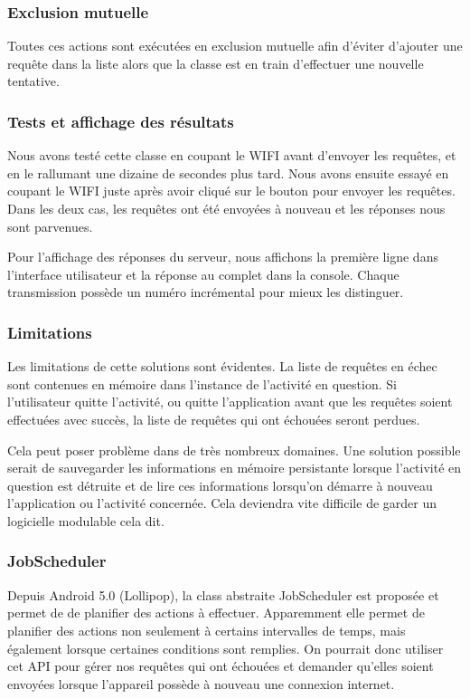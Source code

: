 \documentclass[francais,12pt]{article}
\begin{document}
	\subsubsection*{Exclusion mutuelle}
	Toutes ces actions sont exécutées en exclusion mutuelle afin d'éviter d'ajouter une requête dans la liste alors que la classe est en train d'effectuer une nouvelle tentative. 
	
	\subsubsection*{Tests et affichage des résultats}
	Nous avons testé cette classe en coupant le WIFI avant d'envoyer les requêtes, et en le rallumant une dizaine de secondes plus tard. Nous avons ensuite essayé en coupant le WIFI juste après avoir cliqué sur le bouton pour envoyer les requêtes. Dans les deux cas, les requêtes ont été envoyées à nouveau et les réponses nous sont parvenues. 
	
	Pour l'affichage des réponses du serveur, nous affichons la première ligne dans l'interface utilisateur et la réponse au complet dans la console. Chaque transmission possède un numéro incrémental pour mieux les distinguer.
	
	\subsubsection*{Limitations}
	Les limitations de cette solutions sont évidentes. La liste de requêtes en échec sont contenues en mémoire dans l'instance de l'activité en question. Si l'utilisateur quitte l'activité, ou quitte l'application avant que les requêtes soient effectuées avec succès, la liste de requêtes qui ont échouées seront perdues. 
	
	Cela peut poser problème dans de très nombreux domaines. Une solution possible serait de sauvegarder les informations en mémoire persistante lorsque l'activité en question est détruite et de lire ces informations lorsqu'on démarre à nouveau l'application ou l'activité concernée. Cela deviendra vite difficile de garder un logicielle modulable cela dit.
	
	\subsubsection*{JobScheduler}
	Depuis Android 5.0 (Lollipop), la class abstraite JobScheduler est proposée et permet de de planifier des actions à effectuer. Apparemment elle permet de planifier des actions non seulement à certains intervalles de temps, mais également lorsque certaines conditions sont remplies. On pourrait donc utiliser cet API pour gérer nos requêtes qui ont échouées et demander qu'elles soient envoyées lorsque l'appareil possède à nouveau une connexion internet. 
	
\end{document}
